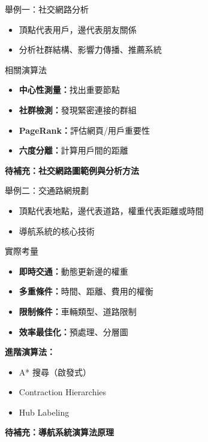 \documentclass{beamer}
\begin{document}
\begin{frame}{舉例一：社交網路分析}
\begin{itemize}
    \item 頂點代表用戶，邊代表朋友關係
    \item 分析社群結構、影響力傳播、推薦系統
\end{itemize}

\vspace{1em}
\begin{block}{相關演算法}
\begin{itemize}
    \item \textbf{中心性測量：}找出重要節點
    \item \textbf{社群檢測：}發現緊密連接的群組
    \item \textbf{PageRank：}評估網頁/用戶重要性
    \item \textbf{六度分離：}計算用戶間的距離
\end{itemize}
\end{block}

\vspace{1em}
\textbf{待補充：社交網路圖範例與分析方法}
\end{frame}

\begin{frame}{舉例二：交通路網規劃}
\begin{itemize}
    \item 頂點代表地點，邊代表道路，權重代表距離或時間
    \item 導航系統的核心技術
\end{itemize}

\vspace{1em}
\begin{block}{實際考量}
\begin{itemize}
    \item \textbf{即時交通：}動態更新邊的權重
    \item \textbf{多重條件：}時間、距離、費用的權衡
    \item \textbf{限制條件：}車輛類型、道路限制
    \item \textbf{效率最佳化：}預處理、分層圖
\end{itemize}
\end{block}

\vspace{1em}
\textbf{進階演算法：}
\begin{itemize}
    \item A* 搜尋（啟發式）
    \item Contraction Hierarchies
    \item Hub Labeling
\end{itemize}

\vspace{1em}
\textbf{待補充：導航系統演算法原理}
\end{frame}
\end{document}
